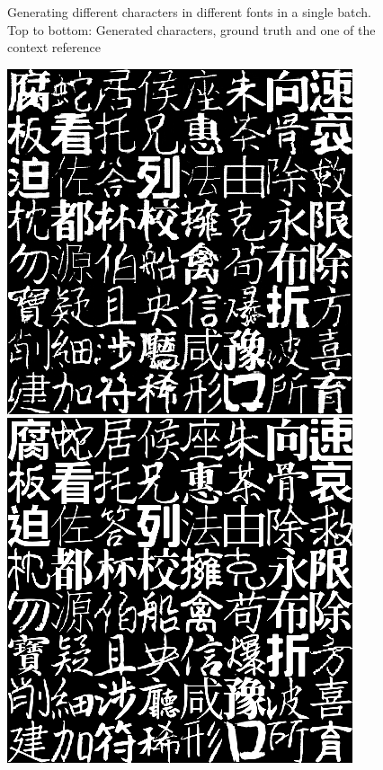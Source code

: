 \documentclass[10pt,twocolumn,letterpaper]{article}
\begin{document}
\begin{figure}[t]
\begin{center}
	\end{center}
	\caption{Generating different characters in different fonts in a single batch. Top to bottom: Generated characters, ground truth and one of the context reference}
	\label{fig:long}
	\label{fig:onecol}
\end{figure}

\begin{figure}[t]
	\begin{center}
		\includegraphics[width=0.8\linewidth]{380gen.png}
		\includegraphics[width=0.8\linewidth]{380gt.png}

\end{center}
\end{figure}
\end{document}
